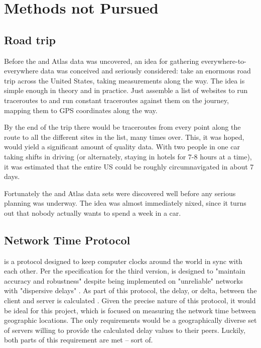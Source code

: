 \section{Methods not Pursued}\label{sec:design_unused_methods}%

\subsection{Road trip}

Before the \caida and \ripe Atlas data was uncovered, an idea for gathering everywhere-to-everywhere data was conceived and seriously considered: take an enormous road trip across the United States, taking measurements along the way. The idea is simple enough in theory and in practice. Just assemble a list of websites to run traceroutes to and run constant traceroutes against them on the journey, mapping them to GPS coordinates along the way.

By the end of the trip there would be traceroutes from every point along the route to all the different sites in the list, many times over. This, it was hoped, would yield a significant amount of quality data. With two people in one car taking shifts in driving (or alternately, staying in hotels for 7-8 hours at a time), it was estimated that the entire US could be roughly circumnavigated in about 7 days.

Fortunately the \caida and \ripe Atlas data sets were discovered well before any serious planning was underway. The idea was almost immediately nixed, since it turns out that nobody actually wants to spend a week in a car.

\subsection{Network Time Protocol}

\ntp is a protocol designed to keep computer clocks around the world in sync with each other. Per the specification for the third version, \ntp is designed to "maintain accuracy and robustness" despite being implemented on "unreliable" networks with "dispersive delays" \cite{rfc1305}. As part of this protocol, the delay, or delta, between the client and server is calculated \cite{rfc5905}. Given the precise nature of this protocol, it would be ideal for this project, which is focused on measuring the network time between geographic locations. The only requirements would be a geographically diverse set of \ntp servers willing to provide the calculated delay values to their peers. Luckily, both parts of this requirement are met -- sort of.

